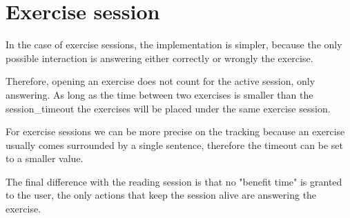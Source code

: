 \section{Exercise session}
In the case of exercise sessions, the implementation is simpler, because the only possible interaction is answering either correctly or wrongly the exercise. 

Therefore, opening an exercise does not count for the active session, only answering. As long as the time between two exercises is smaller than the session\_timeout the exercises will be placed under the same exercise session.

For exercise sessions we can be more precise on the tracking because an exercise usually comes surrounded by a single sentence, therefore the timeout can be set to a smaller value. 

The final difference with the reading session is that no "benefit time" is granted to the user, the only actions that keep the session alive are answering the exercise.





